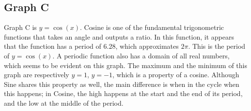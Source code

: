 \subsection{Graph C}

Graph C is $y=\cos(x)$.
Cosine is one of the fundamental trigonometric functions that takes an angle and outputs a ratio.
In this function, it appears that the function has a period of ${6.28}$, which approximates ${2\pi}$.
This is the period of $y=\cos(x)$.
A periodic function also has a domain of all real numbers, which seems to be evident on this graph.
The maximum and the minimum of this graph are respectively $y={1}$, $y={-1}$, which is a property of a cosine.
Although Sine shares this property as well, the main difference is when in the cycle when this happens; in Cosine, the high happens at the start and the end of its period, and the low at the middle of the period. 
